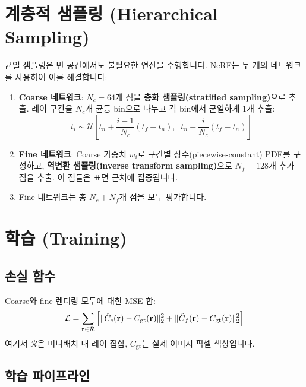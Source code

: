 \documentclass[11pt, a4paper]{report}
\begin{document}
\section{계층적 샘플링 (Hierarchical Sampling)}

균일 샘플링은 빈 공간에서도 불필요한 연산을 수행합니다. NeRF는 두 개의 네트워크를 사용하여 이를 해결합니다:

\begin{enumerate}[leftmargin=*]
  \item \textbf{Coarse 네트워크}: $N_c = 64$개 점을 \textbf{층화 샘플링(stratified sampling)}으로 추출. 레이 구간을 $N_c$개 균등 bin으로 나누고 각 bin에서 균일하게 1개 추출:
  \begin{equation}
    t_i \sim \mathcal{U}\!\left[ t_n + \frac{i-1}{N_c}(t_f - t_n),\;\; t_n + \frac{i}{N_c}(t_f - t_n) \right]
  \end{equation}

  \item \textbf{Fine 네트워크}: Coarse 가중치 $w_i$로 구간별 상수(piecewise-constant) PDF를 구성하고, \textbf{역변환 샘플링(inverse transform sampling)}으로 $N_f = 128$개 추가 점을 추출. 이 점들은 표면 근처에 집중됩니다.

  \item Fine 네트워크는 총 $N_c + N_f$개 점을 모두 평가합니다.
\end{enumerate}


\section{학습 (Training)}

\subsection{손실 함수}

Coarse와 fine 렌더링 모두에 대한 MSE 합:
\begin{equation}
\mathcal{L} = \sum_{\mathbf{r} \in \mathcal{R}} \left[ \| \hat{C}_c(\mathbf{r}) - C_{\text{gt}}(\mathbf{r}) \|_2^2 + \| \hat{C}_f(\mathbf{r}) - C_{\text{gt}}(\mathbf{r}) \|_2^2 \right]
\label{eq:nerf_loss}
\end{equation}
여기서 $\mathcal{R}$은 미니배치 내 레이 집합, $C_{\text{gt}}$는 실제 이미지 픽셀 색상입니다.

\subsection{학습 파이프라인}
\end{document}
